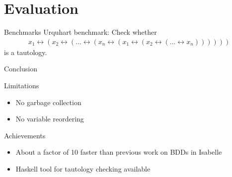 \documentclass{beamer}
\begin{document}
\section{Evaluation}
\begin{frame}{Benchmarks}
	\centering
	Urquhart benchmark:
	Check whether 
	\begin{align*}
	x_1 \longleftrightarrow (x_2 \longleftrightarrow (\dots \longleftrightarrow (x_n \longleftrightarrow (x_1 \longleftrightarrow (x_2 \longleftrightarrow (\dots \longleftrightarrow x_n))))))
	\end{align*}
	is a tautology. 

\end{frame}
\begin{frame}{Conclusion}
	\begin{block}{Limitations}
		\begin{itemize}
			\item No garbage collection
			\item No variable reordering
		\end{itemize}
	\end{block}
	\begin{block}{Achievements}
		\begin{itemize}
			\item About a factor of 10 faster than previous work on BDDs in Isabelle
			\item Haskell tool for tautology checking available
		\end{itemize}
	\end{block}
\end{frame}
\end{document}
